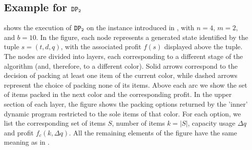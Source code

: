 \documentclass[preprint,11pt]{elsarticle}
\newcommand{\secondDP}{{\tt DP_2}}
\theoremstyle{definition}
\begin{document}
\subsection{Example for $\secondDP$}
 shows the execution of $\secondDP$ on the instance introduced in , with $n=4$, $m =2$, and $b=10$.
In the figure, each node represents a generated state identified by the tuple $s = (t, d, q)$, with the associated profit $f(s)$ displayed above the tuple.
The nodes are divided into layers, each corresponding to a different stage of the algorithm (and, therefore, to a different color). 
Solid arrows correspond to the decision of packing at least one item of the current color, while dashed arrows represent the choice of packing none of its items. 
Above each arc we show the set of items packed in the next color and the corresponding profit.
In the upper section of each layer, the figure shows the packing options returned by the 'inner' dynamic program restricted to the sole items of that color.
For each option, we list the corresponding set of items $S$, number of items $k = |S|$, capacity usage $\Delta q$ and profit $f_c(k, \Delta q)$. 
All the remaining elements of the figure have the same meaning as in .
\end{document}
